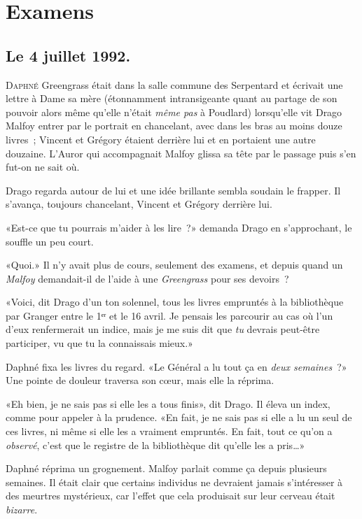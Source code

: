\chapter{Examens}

\section{Le 4 juillet 1992.}

\lettrine{D}{aphné} Greengrass était dans la salle commune des Serpentard et écrivait une lettre à Dame sa mère (étonnamment intransigeante quant au partage de son pouvoir alors même qu'elle n'était \emph{même pas} à Poudlard) lorsqu'elle vit Drago Malfoy entrer par le portrait en chancelant, avec dans les bras au moins douze livres~; Vincent et Grégory étaient derrière lui et en portaient une autre douzaine. L'Auror qui accompagnait Malfoy glissa sa tête par le passage puis s'en fut-on ne sait où.

Drago regarda autour de lui et une idée brillante sembla soudain le frapper. Il s'avança, toujours chancelant, Vincent et Grégory derrière lui.

«Est-ce que tu pourrais m'aider à les lire~?» demanda Drago en s'approchant, le souffle un peu court.

«Quoi.» Il n'y avait plus de cours, seulement des examens, et depuis quand un \emph{Malfoy} demandait-il de l'aide à une \emph{Greengrass} pour ses devoirs~?

«Voici, dit Drago d'un ton solennel, tous les livres empruntés à la bibliothèque par Granger entre le 1ᵉʳ et le 16 avril. Je pensais les parcourir au cas où l'un d'eux renfermerait un indice, mais je me suis dit que \emph{tu} devrais peut-être participer, vu que tu la connaissais mieux.»

Daphné fixa les livres du regard. «Le Général a lu tout ça en \emph{deux semaines}~?» Une pointe de douleur traversa son cœur, mais elle la réprima.

«Eh bien, je ne sais pas si elle les a tous finis», dit Drago. Il éleva un index, comme pour appeler à la prudence. «En fait, je ne sais pas si elle a lu un seul de ces livres, ni même si elle les a vraiment empruntés. En fait, tout ce qu'on a \emph{observé}, c'est que le registre de la bibliothèque dit qu'elle les a pris…»

Daphné réprima un grognement. Malfoy parlait comme ça depuis plusieurs semaines. Il était clair que certains individus ne devraient jamais s'intéresser à des meurtres mystérieux, car l'effet que cela produisait sur leur cerveau était \emph{bizarre}.

